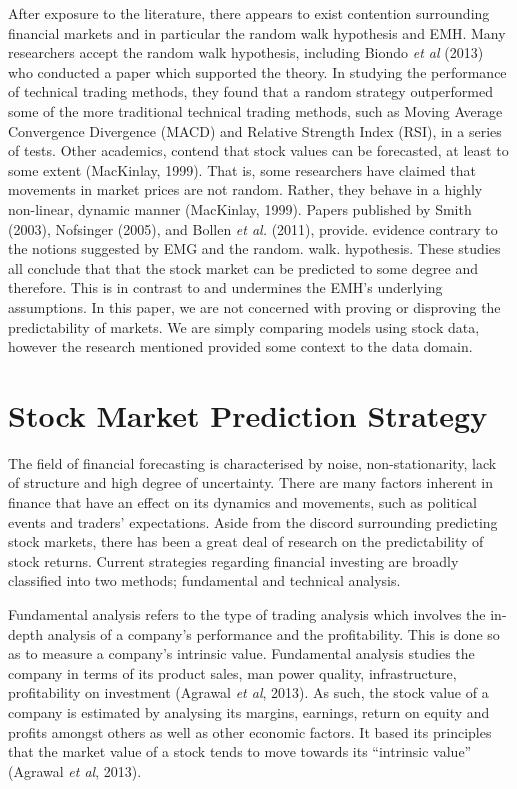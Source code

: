 After exposure to the literature, there appears to exist contention surrounding financial markets and in particular the random walk hypothesis and EMH. Many researchers accept the random walk hypothesis, including Biondo \textit{et al} (2013) who conducted a paper which supported the theory. In studying the performance of technical trading methods, they found that a random strategy outperformed some of the more traditional technical trading methods, such as Moving Average Convergence Divergence (MACD) and Relative Strength Index (RSI), in a series of tests.  Other academics, contend that stock values can be forecasted, at least to some extent (MacKinlay, 1999).
 That is, some researchers have claimed that movements in market prices are not random. Rather, they behave in a highly non-linear, dynamic manner (MacKinlay, 1999). Papers published by Smith (2003), Nofsinger (2005), and Bollen \textit{et al.} (2011), provide. evidence contrary to the notions suggested by EMG and the random. walk. hypothesis.  These studies all conclude that that the stock market can be predicted to some degree and therefore. This is in contrast to and undermines the EMH’s underlying assumptions. In this paper, we are not concerned with proving or disproving the predictability of markets. We are simply comparing models using stock data, however the research mentioned provided some context to the data domain. 

\section{Stock Market Prediction Strategy}

The field of financial forecasting is characterised by noise, non-stationarity, lack of structure and high degree of uncertainty. There are many factors inherent in finance that have an effect on its dynamics and movements, such as political events and traders’ expectations. Aside from the discord surrounding predicting stock markets, there has been a great deal of research on the predictability of stock returns. Current strategies regarding financial investing are broadly classified into two methods; fundamental and technical analysis. 

Fundamental analysis refers to the type of trading analysis which involves the in-depth analysis of a company’s performance and the profitability. This is done so as to measure a company's intrinsic value. Fundamental analysis studies the company in terms of its product sales, man power quality, infrastructure, profitability on investment (Agrawal \textit{et al}, 2013). As such, the stock value of a company is estimated by analysing its margins, earnings, return on equity and profits amongst others as well as other economic factors. It based its principles that the market value of a stock tends to move towards its “intrinsic value”  (Agrawal \textit{et al}, 2013). 

